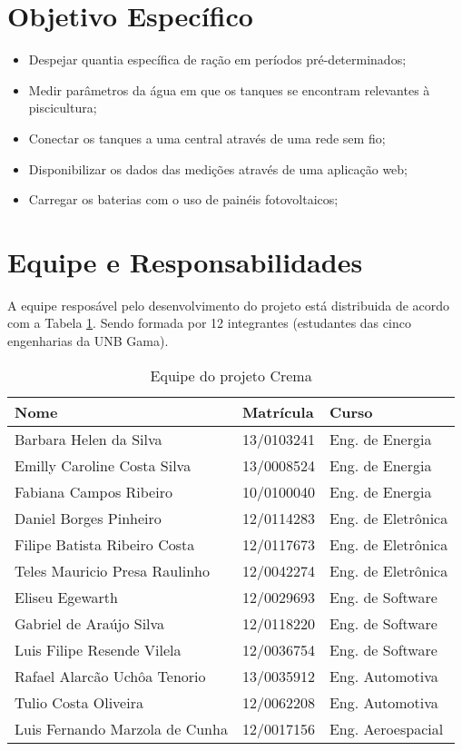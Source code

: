 \section{Objetivo Específico}

\begin{itemize}
  \item Despejar quantia específica de ração em períodos pré-determinados;
  \item Medir parâmetros da água em que os tanques se encontram relevantes à piscicultura;
  \item Conectar os tanques a uma central através de uma rede sem fio;
  \item Disponibilizar os dados das medições através de uma aplicação web;
  \item Carregar os baterias com o uso de painéis fotovoltaicos;
\end{itemize}

\section{Equipe e Responsabilidades}

A equipe resposável pelo desenvolvimento do projeto está distribuida de acordo com a Tabela \ref{equipe}. Sendo formada por 12 integrantes (estudantes das cinco engenharias da UNB Gama).

\begin{table}[H]
\centering
\caption{Equipe do projeto Crema}
\label{equipe}
\begin{tabular}{|l|l|l|}
\hline
Nome                           & Matrícula  & Curso              \\ \hline
Barbara Helen da Silva         & 13/0103241 & Eng. de Energia    \\ \hline
Emilly Caroline Costa Silva    & 13/0008524 & Eng. de Energia    \\ \hline
Fabiana Campos Ribeiro         & 10/0100040 & Eng. de Energia    \\ \hline
Daniel Borges Pinheiro         & 12/0114283 & Eng. de Eletrônica \\ \hline
Filipe Batista Ribeiro Costa   & 12/0117673 & Eng. de Eletrônica \\ \hline
Teles Mauricio Presa Raulinho  & 12/0042274 & Eng. de Eletrônica \\ \hline
Eliseu Egewarth                & 12/0029693 & Eng. de Software   \\ \hline
Gabriel de Araújo Silva        & 12/0118220 & Eng. de Software   \\ \hline
Luis Filipe Resende Vilela     & 12/0036754 & Eng. de Software   \\ \hline
Rafael Alarcão Uchôa Tenorio   & 13/0035912 & Eng. Automotiva    \\ \hline
Tulio Costa Oliveira           & 12/0062208 & Eng. Automotiva    \\ \hline
Luis Fernando Marzola de Cunha & 12/0017156 & Eng. Aeroespacial  \\ \hline
\end{tabular}
\end{table}

